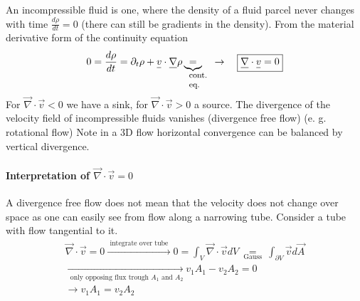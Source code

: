 An incompressible fluid is one, where the density of a fluid parcel never changes with time $\frac{d\rho}{dt} = 0$ (there can still be gradients in the density). From the material derivative form of the continuity equation
\begin{equation}
    0 = \frac{d\rho}{dt} = \partial_t \rho + \vec{v} \cdot \vec{\nabla} \rho \explain{=}{cont. eq.}  \quad \rightarrow \quad \boxed{\vec{\nabla} \cdot \vec{v} = 0}
\end{equation}
For $\vec{\nabla}\cdot \vec{v} < 0$ we have a sink, for $\vec{\nabla}\cdot \vec{v} > 0$ a source.
The divergence of the velocity field of incompressible fluids vanishes (divergence free flow) (e. g. rotational flow)
Note in a 3D flow horizontal convergence can be balanced by vertical divergence.
\paragraph{Interpretation of $\vec{\nabla}\cdot \vec{v} = 0$} A divergence free flow does not mean that the velocity does not change over space as one can easily see from flow along a narrowing tube.
Consider a tube with flow tangential to it.
\begin{equation}
    \begin{gathered}
    \vec{\nabla} \cdot \vec{v}=0 \xrightarrow{\text { integrate over tube }} 0=\int_V \vec{\nabla} \cdot \vec{v} d V \underset{\text { Gauss }}{=} \int_{\partial V} \vec{v} d \vec{A} \\
    \xrightarrow[\text { only opposing flux trough } A_1 \text { and } A_2]{} v_1 A_1-v_2 A_2=0 \\
    \rightarrow v_1 A_1=v_2 A_2
    \end{gathered}
\end{equation}

